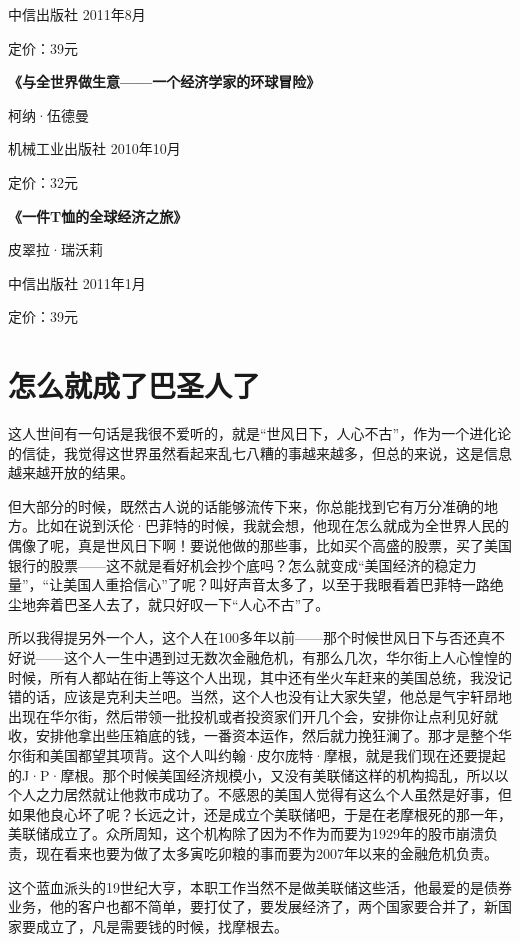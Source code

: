 中信出版社 2011年8月

定价：39元

\textbf{《与全世界做生意------一个经济学家的环球冒险》}

柯纳·伍德曼

机械工业出版社 2010年10月

定价：32元

\textbf{《一件T恤的全球经济之旅》}

皮翠拉·瑞沃莉

中信出版社 2011年1月

定价：39元

\hypertarget{ux600eux4e48ux5c31ux6210ux4e86ux5df4ux5723ux4ebaux4e86}{%
\section{怎么就成了巴圣人了}\label{ux600eux4e48ux5c31ux6210ux4e86ux5df4ux5723ux4ebaux4e86}}

这人世间有一句话是我很不爱听的，就是``世风日下，人心不古''，作为一个进化论的信徒，我觉得这世界虽然看起来乱七八糟的事越来越多，但总的来说，这是信息越来越开放的结果。

但大部分的时候，既然古人说的话能够流传下来，你总能找到它有万分准确的地方。比如在说到沃伦·巴菲特的时候，我就会想，他现在怎么就成为全世界人民的偶像了呢，真是世风日下啊！要说他做的那些事，比如买个高盛的股票，买了美国银行的股票------这不就是看好机会抄个底吗？怎么就变成``美国经济的稳定力量''，``让美国人重拾信心''了呢？叫好声音太多了，以至于我眼看着巴菲特一路绝尘地奔着巴圣人去了，就只好叹一下``人心不古''了。

所以我得提另外一个人，这个人在100多年以前------那个时候世风日下与否还真不好说------这个人一生中遇到过无数次金融危机，有那么几次，华尔街上人心惶惶的时候，所有人都站在街上等这个人出现，其中还有坐火车赶来的美国总统，我没记错的话，应该是克利夫兰吧。当然，这个人也没有让大家失望，他总是气宇轩昂地出现在华尔街，然后带领一批投机或者投资家们开几个会，安排你让点利见好就收，安排他拿出些压箱底的钱，一番资本运作，然后就力挽狂澜了。那才是整个华尔街和美国都望其项背。这个人叫约翰·皮尔庞特·摩根，就是我们现在还要提起的J·P·摩根。那个时候美国经济规模小，又没有美联储这样的机构捣乱，所以以个人之力居然就让他救市成功了。不感恩的美国人觉得有这么个人虽然是好事，但如果他良心坏了呢？长远之计，还是成立个美联储吧，于是在老摩根死的那一年，美联储成立了。众所周知，这个机构除了因为不作为而要为1929年的股市崩溃负责，现在看来也要为做了太多寅吃卯粮的事而要为2007年以来的金融危机负责。

这个蓝血派头的19世纪大亨，本职工作当然不是做美联储这些活，他最爱的是债券业务，他的客户也都不简单，要打仗了，要发展经济了，两个国家要合并了，新国家要成立了，凡是需要钱的时候，找摩根去。

